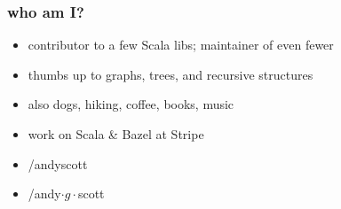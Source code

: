 \documentclass[include/preamble.tex]{subfiles}
\begin{document}

\begin{frame}
  \frametitle{who am I?}
  \begin{itemize}
    \pause
  \item contributor to a few Scala libs; maintainer of even fewer
  \item thumbs up to graphs, trees, and recursive structures
  \item also dogs, hiking, coffee, books, music
  \item work on Scala \& Bazel at Stripe
    \newline
    \pause
  \item {} /andyscott
  \item {} /andy$\cdot{g}\cdot$scott
  \end{itemize}
\end{frame}
\end{document}
